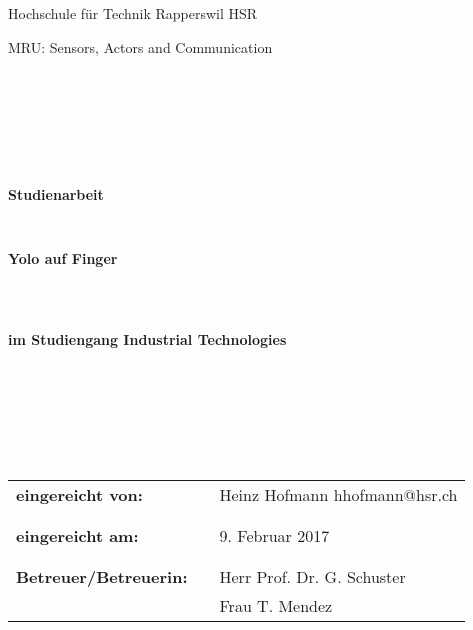 
\thispagestyle{empty}
\begin{center}
\Large{Hochschule für Technik Rapperswil HSR}\\
\end{center}

\begin{center}
\Large{MRU: Sensors, Actors and Communication}
\end{center}
\begin{verbatim}







\end{verbatim}
\begin{center}
\textbf{\LARGE{Studienarbeit}}
\end{center}
\begin{verbatim}


\end{verbatim}
\begin{center}
\textbf{\Huge{Yolo auf Finger}}
\end{center}
\begin{verbatim}



\end{verbatim}
\begin{center}
\textbf{im Studiengang Industrial Technologies}
\end{center}
\begin{verbatim}







\end{verbatim}

\begin{flushleft}
\begin{tabular}{lll}
\textbf{eingereicht von:} & & Heinz Hofmann \flq{}hhofmann@hsr.ch\frq{}\\
& & \\
& & \\
\textbf{eingereicht am:} & & 9. Februar 2017\\
& & \\
& & \\
\textbf{Betreuer/Betreuerin:} & & Herr Prof. Dr. G. Schuster \\
& & Frau T. Mendez
\end{tabular}
\end{flushleft}









 
